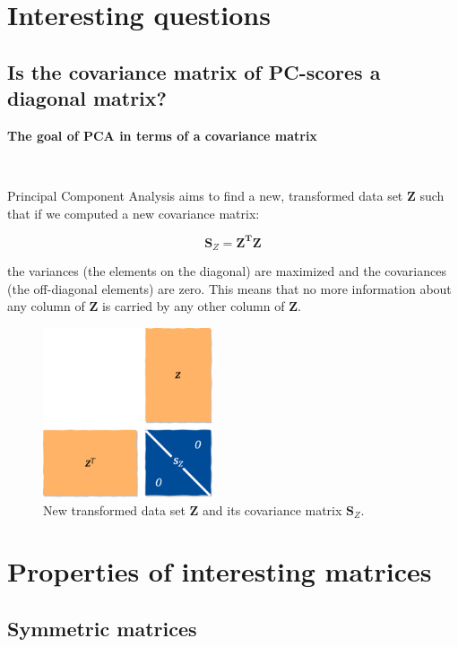\documentclass[10pt,twocolumn]{article}
\begin{document}
\section{Interesting questions}

\subsection{Is the covariance matrix of PC-scores a diagonal matrix?}

\textbf{The goal of PCA in terms of a covariance matrix}

\,\,
\,\,

Principal Component Analysis aims to find a new, transformed data set $\bm{Z}$ such that if we computed a new covariance matrix:

\begin{equation}
\bm{S}_Z =  \bm{Z^T} \bm{Z}
\end{equation}

the variances (the elements on the diagonal) are maximized and the covariances (the off-diagonal elements) are zero. This means that no more information about any column of $\bm{Z}$ is carried by any other column of $\bm{Z}$.

\begin{figure}[H]
\centering\includegraphics[width=5cm]{PC-scores.png}
\caption{New transformed data set $\bm{Z}$ and its covariance matrix $\bm{S}_Z$.}
\label{fig:PC-scores}
\end{figure}

\appendix

\section{Properties of interesting matrices}

\subsection{Symmetric matrices} \label{app:A}
\end{document}
